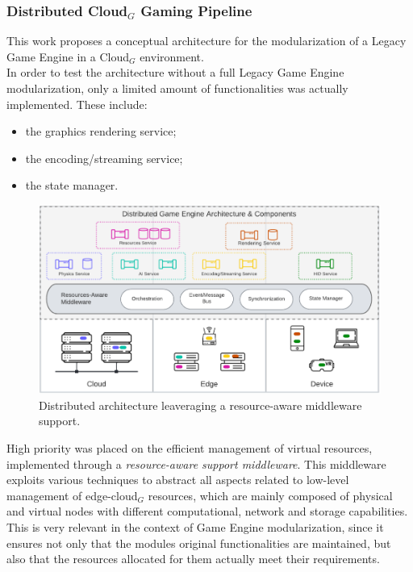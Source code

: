 \subsubsection{Distributed Cloud$_G$ Gaming Pipeline \cite{womak:distributed-cloud-gaming-pipeline}}
This work proposes a conceptual architecture for the modularization of a Legacy Game Engine in a Cloud$_G$ environment. \\
In order to test the architecture without a full Legacy Game Engine modularization, only a limited amount of functionalities was actually implemented. These include:
\begin{itemize}
	\item the graphics rendering service;
	\item the encoding/streaming service;
	\item the state manager.
\end{itemize}
\begin{figure}[h!]
	\centering
	\includegraphics[width=1\linewidth]{immagini/State-of-the-art/resource-aware-middleware-architecture}
	\caption[Distributed architecture leaveraging a resource-aware middleware support.]{Distributed architecture leaveraging a resource-aware middleware support.}
	\label{fig:resource-aware-middleware-architecture}
\end{figure}
High priority was placed on the efficient management of virtual resources, implemented through a \textit{resource-aware support middleware}. This middleware exploits various techniques to abstract all aspects related to low-level management of edge-cloud$_G$ resources, which are mainly composed of physical and virtual nodes with different computational, network and storage capabilities. \\
This is very relevant in the context of Game Engine modularization, since it ensures not only that the modules original functionalities are maintained, but also that the resources allocated for them actually meet their requirements. \\ \\
